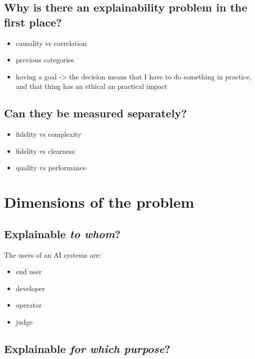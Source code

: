 \documentclass[conference]{IEEEtran}
\begin{document}
\subsection{Why is there an explainability problem in the first place?}

\begin{itemize}
    \item causality vs correlation
    \item previous categories
    \item having a goal -> the decision means that I have to do something in
          practice, and that thing has an ethical an practical impact
\end{itemize}


\subsection{Can they be measured separately?}

\begin{itemize}
    \item fidelity vs complexity
    \item fidelity vs clearness
    \item quality vs performance
\end{itemize}


\section{Dimensions of the problem}
\label{sec:explainability}

\subsection{Explainable \textit{to whom}?}

The users of an AI systems are:

\begin{itemize}
    \item end user
    \item developer
    \item operator
    \item judge
\end{itemize}

\subsection{Explainable \textit{for which purpose}?}
\end{document}
